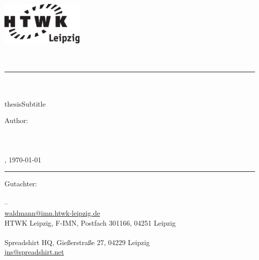 
\begin{center}
    \includegraphics[width=4cm]{frontpage/HTWK_Logo_schwarz}\\
    \vspace{12pt}
    \large
        \textbf{\thesisUniversity}\\
    \vspace{6pt}
    \normalsize
        \thesisUniversityDepartment\\

    \vspace{24pt}
    \rule{\textwidth}{0.5pt}
    \vspace{12pt}

    \Huge
        \thesisDesignator{}\\
    \vspace{12pt}
    \Large
        \textbf{\thesisTitle}\\
        \ifcsname thesisSubtitle \endcsname
            \large
            \thesisSubtitle
        \else
        \fi
    \vspace{24pt}

    \small
        Author:\\
    \vspace{6pt}
    \large
        \textbf{\thesisAuthor}\\
        \vspace{3pt}
        \normalsize
        \thesisAuthorClass\\
        \href{mailto:\thesisAuthorEmail}{\thesisAuthorEmail}\\
        \thesisAuthorCity, \today\\        

    \vspace{24pt}
    \rule{\textwidth}{0.5pt}
    \vspace{12pt}

    \vfill
    \small
        Gutachter:\\
    \vspace{6pt}
    \large
        \thesisAdvisor\\
    \small
        \thesisUniversity{} -- \thesisUniversityDepartment\\
        \href{mailto:waldmann@imn.htwk-leipzig.de}{waldmann@imn.htwk-leipzig.de}\\
        HTWK Leipzig, F-IMN, Postfach 301166, 04251 Leipzig\\

    \vspace{6pt}
    \large
        \thesisAdvisorSprd\\
    \small
        Spreadshirt HQ, Gießerstraße 27, 04229 Leipzig\\
        \href{mailto:jns@spreadshirt.net}{jns@spreadshirt.net}\\
\end{center}
